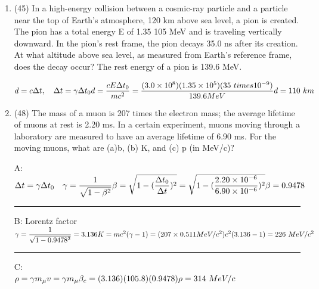 \documentclass[fleqn]{article}
\begin{document}
\begin{enumerate}
    \item (45) In a high-energy collision between a cosmic-ray particle and a particle near the top of Earth’s atmosphere, 120 km above sea
    level, a pion is created. The pion has a total energy E of 1.35  105 MeV and is traveling vertically downward. In the pion’s rest frame,
    the pion decays 35.0 ns after its creation. At what altitude above sea level, as measured from Earth’s reference frame, does the decay occur? The rest energy of a pion is 139.6 MeV.

      \textcolor{hwColor}{
        $
          d=c\Delta t, ~~~ \Delta t=\gamma \Delta t_0 \\
          d=\dfrac{cE \Delta t_0}{mc^2}=\dfrac{(3.0 \times 10^8)(1.35 \times 10^5)(35 \ times 10^{-9})}{139.6 MeV} \\
          \\
          d=110 ~ km
        $
      }

    \item (48) The mass of a muon is 207 times the electron mass; the average lifetime of muons at rest is 2.20 ms. In a certain experiment, muons moving through a laboratory are measured to have
    an average lifetime of 6.90 ms. For the moving muons, what are (a)b, (b) K, and (c) p (in MeV/c)?

      \textcolor{hwColor}{
        A: \\
        $
          \Delta t=\gamma \Delta t_0 ~~~ \gamma=\dfrac{1}{\sqrt{1-\beta^2}} \\
          \beta = \sqrt{1-(\dfrac{\Delta t_0}{\Delta t})^2}=\sqrt{1-(\dfrac{2.20 \times 10^{-6}}{6.90 \times 10^{-6}})^2} \\
          \\
          \beta=0.9478
        $
      }

      \textcolor{hwColor}{   
        \rule{15cm}{0.4pt}   
      }

      \textcolor{hwColor}{
        B: Lorentz factor \\
        $
          \gamma= \dfrac{1}{\sqrt{1-0.9478^2}}=3.136 \\
          \\
          \\
          K=mc^2(\gamma -1)=(207 \times 0.511 MeV/c^2)c^2(3.136-1)=226 ~ MeV/c^2 
        $
      }

      \textcolor{hwColor}{   
        \rule{15cm}{0.4pt}   
      }

      \textcolor{hwColor}{
        C: \\
        $
          \rho=\gamma m_\mu v=\gamma m_\mu \beta_c=(3.136)(105.8)(0.9478) \\
          \rho=314 ~ MeV/c
        $
      }


\end{enumerate}
\end{document}
